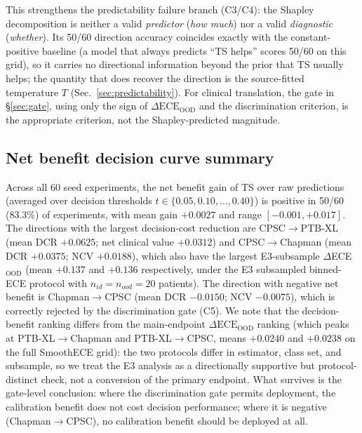 \documentclass[review,12pt,nonatbib]{elsarticle}
\begin{document}
This strengthens the predictability failure branch (C3/C4): the
Shapley decomposition is neither a valid \emph{predictor} (\emph{how
much}) nor a valid \emph{diagnostic} (\emph{whether}). Its 50/60
direction accuracy coincides exactly with the constant-positive
baseline (a model that always predicts ``TS helps'' scores 50/60 on
this grid), so it carries no directional information beyond the prior
that TS usually helps; the quantity that does recover the direction is
the source-fitted temperature $T$
(Sec.~\ref{sec:predictability}). For clinical translation, the gate in
\S\ref{sec:gate}, using only the sign of
$\Delta\text{ECE}_{\text{OOD}}$ and the discrimination criterion, is the
appropriate criterion, not the Shapley-predicted magnitude.

\subsection{Net benefit decision curve summary}
\label{sec:net_benefit_summary}
Across all 60 seed experiments, the net benefit gain of TS over raw
predictions (averaged over decision thresholds $t \in \{0.05, 0.10,
\ldots, 0.40\}$) is positive in 50/60 (83.3\%) of experiments, with
mean gain $+0.0027$ and range $[-0.001, +0.017]$. The directions with
the largest decision-cost reduction are CPSC$\rightarrow$PTB-XL
(mean DCR $+0.0625$; net clinical value $+0.0312$) and
CPSC$\rightarrow$Chapman (mean DCR $+0.0375$; NCV $+0.0188$), which
also have the largest E3-subsample $\Delta$ECE$_{\text{OOD}}$ (mean
$+0.137$ and $+0.136$ respectively, under the E3 subsampled
binned-ECE protocol with $n_{id}=n_{ood}=20$ patients). The direction
with negative net benefit is Chapman$\rightarrow$CPSC (mean DCR
$-0.0150$; NCV $-0.0075$), which is correctly rejected by the
discrimination gate (C5). We note that the decision-benefit ranking
differs from the main-endpoint $\Delta\text{ECE}_{\text{OOD}}$ ranking
(which peaks at PTB-XL$\rightarrow$Chapman and PTB-XL$\rightarrow$CPSC,
means $+0.0240$ and $+0.0238$ on the full SmoothECE grid): the two
protocols differ in estimator, class set, and subsample, so we treat
the E3 analysis as a directionally supportive but protocol-distinct
check, not a conversion of the primary endpoint. What survives is the
gate-level conclusion: where the discrimination gate permits
deployment, the calibration benefit does not cost decision
performance; where it is negative (Chapman$\rightarrow$CPSC), no
calibration benefit should be deployed at all.
\end{document}
